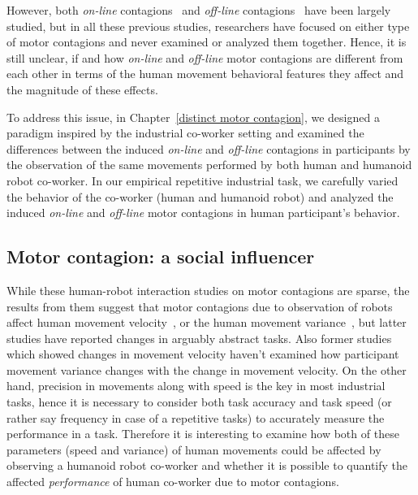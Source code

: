 However, both \textit{on-line} contagions~\cite{Kupferberg:Methods:2009, Oztop:RAS_ICHR:2004, Chaminade:JPP:2009, Kupferberg:PlosOne:2012, Brass:ActaPsych:2001, Press:CBR:2005} and \textit{off-line} contagions~\cite{Noy:B&C:2009, Kilner:SocialNeuro:2007, Bisio:PlosOne:2010, heyes2011automatic, Ikegami:SciReport:2014, Ikegami:elife:2018} have been largely studied,  but in all these previous studies, researchers have focused on either type of motor contagions and never examined or analyzed them together. Hence, it is still unclear, if and how \textit{on-line} and \textit{off-line} motor contagions are different from each other in terms of the human movement behavioral features they affect and the magnitude of these effects. 

To address this issue, in Chapter~\ref{distinct motor contagion}, we designed a paradigm inspired by the industrial co-worker setting and examined the differences between the induced \textit{on-line} and \textit{off-line} contagions in participants by the observation of the same movements performed by both human and humanoid robot co-worker. In our empirical repetitive industrial task, we carefully varied the behavior of the co-worker (human and humanoid robot) and analyzed the induced \textit{on-line} and \textit{off-line} motor contagions in human participant's behavior.


\subsection{Motor contagion: a social influencer}\label{influence performance}

While these human-robot interaction studies on motor contagions are sparse, the results from them suggest that motor contagions due to observation of robots affect human movement velocity~\cite{Noy:B&C:2009, Kilner:SocialNeuro:2007, Bisio:PlosOne:2010, Bisio:PlosOne:2014}, or the human movement variance~\cite{Kupferberg:Methods:2009, Kupferberg:PlosOne:2012, Brass:ActaPsych:2001, Press:CBR:2005}, but latter studies have reported changes in arguably abstract tasks. Also former studies which showed changes in movement velocity haven't examined how participant movement variance changes with the change in movement velocity. On the other hand, precision in movements along with speed is the key in most industrial tasks, hence it is necessary to consider both task accuracy and task speed (or rather say frequency in case of a repetitive tasks) to accurately measure the performance in a task. Therefore it is interesting to examine how both of these parameters (speed and variance) of human movements could be affected by observing a humanoid robot co-worker and whether it is possible to quantify the affected \textit{performance} of human co-worker due to motor contagions.

